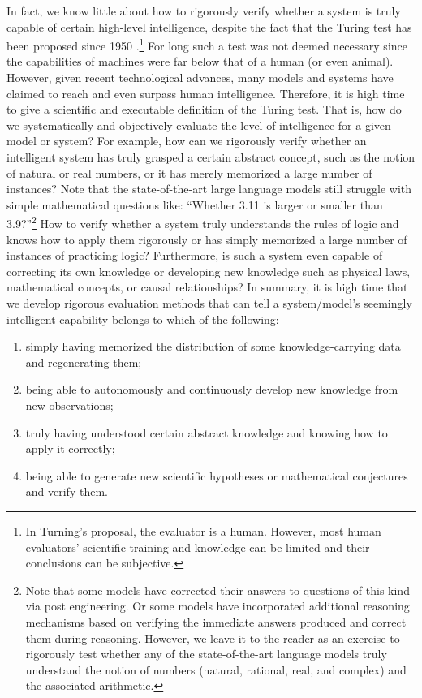\documentclass[../../book-main.tex]{subfiles}
\begin{document}
In fact, we know little about how to rigorously verify whether a system is truly capable of certain high-level intelligence, despite the fact that the Turing test has been proposed since 1950 \cite{Turing-1950}.\footnote{In Turning's proposal, the evaluator is a human. However, most human evaluators' scientific training and knowledge can be limited and their conclusions can be subjective.} For long such a test was not deemed necessary since the capabilities of machines were far below that of a human (or even animal). However, given recent technological advances, many models and systems have claimed to reach and even surpass human intelligence. Therefore, it is high time to give a scientific and executable definition of the Turing test. That is, how do we systematically and objectively evaluate the level of intelligence for a given model or system? For example, how can we rigorously verify whether an intelligent system has truly grasped a certain abstract concept, such as the notion of natural or real numbers, or it has merely memorized a large number of instances? Note that the state-of-the-art large language models still struggle with simple mathematical questions like: ``Whether 3.11 is larger or smaller than 3.9?''\footnote{Note that some  models have corrected their answers to questions of this kind via post engineering. Or some models have incorporated additional reasoning mechanisms based on verifying the immediate answers produced and correct them during reasoning. However, we leave it to the reader as an exercise to rigorously test whether any of the state-of-the-art language models truly understand the notion of numbers (natural, rational, real, and complex) and the associated arithmetic.} 
How to verify whether a system truly understands the rules of logic and knows how to apply them rigorously or has simply memorized a large number of instances of practicing logic? Furthermore, is such a system even capable of correcting its own knowledge or developing new knowledge such as physical laws, mathematical concepts, or causal relationships? In summary, it is high time that we develop rigorous evaluation methods that can tell a system/model's seemingly intelligent capability belongs to which of the following: 
\begin{enumerate}
    \item simply having memorized the distribution of some knowledge-carrying data and regenerating them;
    \item being able to autonomously and continuously develop new knowledge from new observations;
    \item truly having understood certain abstract knowledge and knowing how to apply it correctly;
    \item being able to generate new scientific hypotheses or mathematical conjectures and verify them.
\end{enumerate}
\end{document}
